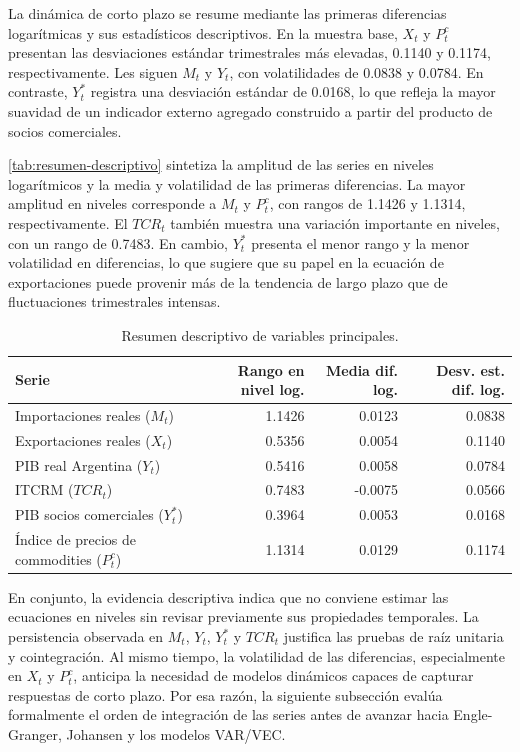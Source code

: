 \documentclass[11pt,a4paper]{article}
\begin{document}
	La dinámica de corto plazo se resume mediante las primeras diferencias
	logarítmicas y sus estadísticos descriptivos. En la muestra base, \(X_t\) y
	\(P_t^c\) presentan las desviaciones estándar trimestrales más elevadas, 0.1140
	y 0.1174, respectivamente. Les siguen \(M_t\) y \(Y_t\), con volatilidades de
	0.0838 y 0.0784. En contraste, \(Y_t^*\) registra una desviación estándar de
	0.0168, lo que refleja la mayor suavidad de un indicador externo agregado
	construido a partir del producto de socios comerciales.
	
	\autoref{tab:resumen-descriptivo} sintetiza la amplitud de las series en
	niveles logarítmicos y la media y volatilidad de las primeras diferencias. La
	mayor amplitud en niveles corresponde a \(M_t\) y \(P_t^c\), con rangos de
	1.1426 y 1.1314, respectivamente. El \(TCR_t\) también muestra una variación
	importante en niveles, con un rango de 0.7483. En cambio, \(Y_t^*\) presenta el
	menor rango y la menor volatilidad en diferencias, lo que sugiere que su papel
	en la ecuación de exportaciones puede provenir más de la tendencia de largo
	plazo que de fluctuaciones trimestrales intensas.
	
	\begin{table}[H]
		\centering
		\caption{Resumen descriptivo de variables principales.}
		\label{tab:resumen-descriptivo}
		\small
		\begin{tabular}{lrrr}
			\toprule
			Serie & Rango en nivel log. & Media dif. log. & Desv. est. dif. log. \\
			\midrule
			Importaciones reales (\(M_t\)) & 1.1426 & 0.0123 & 0.0838 \\
			Exportaciones reales (\(X_t\)) & 0.5356 & 0.0054 & 0.1140 \\
			PIB real Argentina (\(Y_t\)) & 0.5416 & 0.0058 & 0.0784 \\
			ITCRM (\(TCR_t\)) & 0.7483 & -0.0075 & 0.0566 \\
			PIB socios comerciales (\(Y_t^*\)) & 0.3964 & 0.0053 & 0.0168 \\
			Índice de precios de commodities (\(P_t^c\)) & 1.1314 & 0.0129 & 0.1174 \\
			\bottomrule
		\end{tabular}
	\end{table}
	
	En conjunto, la evidencia descriptiva indica que no conviene estimar las
	ecuaciones en niveles sin revisar previamente sus propiedades temporales. La
	persistencia observada en \(M_t\), \(Y_t\), \(Y_t^*\) y \(TCR_t\) justifica las
	pruebas de raíz unitaria y cointegración. Al mismo tiempo, la volatilidad de
	las diferencias, especialmente en \(X_t\) y \(P_t^c\), anticipa la necesidad de
	modelos dinámicos capaces de capturar respuestas de corto plazo. Por esa razón,
	la siguiente subsección evalúa formalmente el orden de integración de las
	series antes de avanzar hacia Engle-Granger, Johansen y los modelos VAR/VEC.
	
\end{document}
